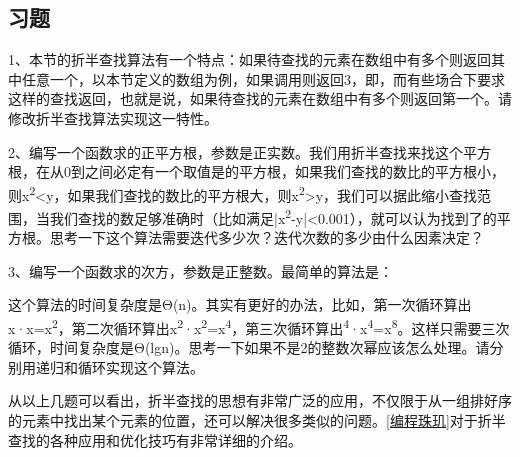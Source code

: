 \subsection*{习题}
%


1、本节的折半查找算法有一个特点：如果待查找的元素在数组中有多个则返回其中任意一个，以本节定义的数组为例，如果调用则返回3，即，而有些场合下要求这样的查找返回，也就是说，如果待查找的元素在数组中有多个则返回第一个。请修改折半查找算法实现这一特性。



2、编写一个函数求的正平方根，参数是正实数。我们用折半查找来找这个平方根，在从0到之间必定有一个取值是的平方根，如果我们查找的数比的平方根小，则x\textsuperscript{2}\textless{}y，如果我们查找的数比的平方根大，则x\textsuperscript{2}\textgreater{}y，我们可以据此缩小查找范围，当我们查找的数足够准确时（比如满足|x\textsuperscript{2}-y|\textless{}0.\BookSplit{}001），就可以认为找到了的平方根。思考一下这个算法需要迭代多少次？迭代次数的多少由什么因素决定？



3、编写一个函数求的次方，参数是正整数。最简单的算法是：




这个算法的时间复杂度是Θ(n)。其实有更好的办法，比如，第一次循环算出x·x=\BookSplit{}x\textsuperscript{2}，第二次循环算出x\textsuperscript{2}·x\textsuperscript{2}=x\textsuperscript{4}，第三次循环算出\textsuperscript{4}·x\textsuperscript{4}=x\textsuperscript{8}。这样只需要三次循环，时间复杂度是Θ(lgn)。思考一下如果不是2的整数次幂应该怎么处理。请分别用递归和循环实现这个算法。



从以上几题可以看出，折半查找的思想有非常广泛的应用，不仅限于从一组排好序的元素中找出某个元素的位置，还可以解决很多类似的问题。\hyperlink{db.bi01.bibli.pearls}{[编程珠玑]}对于折半查找的各种应用和优化技巧有非常详细的介绍。

